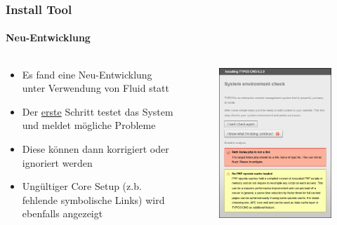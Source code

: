 \begin{frame}[fragile]
	\frametitle{Install Tool}
	\framesubtitle{Neu-Entwicklung}

	\begin{columns}[T]

		\begin{column}{.5\textwidth}
			\begin{itemize}
				\item Es fand eine Neu-Entwicklung unter Verwendung von Fluid statt
				\item Der \underline{erste} Schritt testet das System und meldet mögliche Probleme
				\item Diese können dann korrigiert oder ignoriert werden
				\item Ungültiger Core Setup (z.b. fehlende symbolische Links) wird ebenfalls angezeigt
			\end{itemize}
		\end{column}

		\begin{column}{.5\textwidth}
			\begin{figure}\vspace*{-0.4cm}
				\includegraphics[width=0.8\linewidth]{Images/InstallTool/SystemEnvironmentCheck.png}
			\end{figure}
		\end{column}

	\end{columns}

\end{frame}

